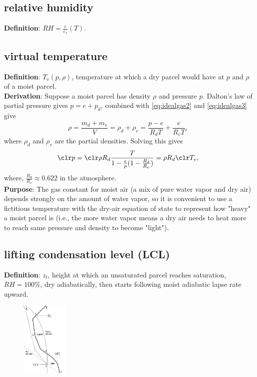 \subsection{relative humidity}
{\bf Definition}: $RH = \frac{e}{e_s}(T)$.

\subsection{virtual temperature}

{\bf Definition}: $T_v(p,\rho)$, temperature at which a dry parcel would have at $p$ and $\rho$ of a
moist parcel. \\

{\bf Derivation}: Suppose a moist parcel has density $\rho$ and pressure $p$.
Dalton's law of partial pressure gives $p = e + p_d$, combined with \eqref{eq:idealgas2} and
\eqref{eq:idealgas3} give
\begin{equation}
   \rho = \frac{m_d + m_v}{V} = \rho_d + \rho_v = \frac{p-e}{R_dT} + \frac{e}{R_vT}, 
\end{equation}
where $\rho_d$ and $\rho_v$ are the partial densities.
Solving this gives
\begin{equation}
   {\clr p} = {\clr \rho} R_d \frac{T}{1-\frac{e}{p}(1-\frac{R_d}{R_v})} = \rho R_d {\clr T_v},
\end{equation}
where, $\frac{R_d}{R_v} \approx 0.622$ in the atmosphere. \\

{\bf Purpose}:
The gas constant for moist air (a mix of pure water vapor and dry air) depends strongly on the
amount of water vapor, so it is convenient to use a fictitious temperature with the dry-air equation
of state to represent how "heavy" a moist parcel is (i.e., the more water vapor means a dry air
needs to heat more to reach same pressure and density to become "light"). \\

\subsection{lifting condensation level (LCL)}
{\bf Definition}: $z_l$, height at which an unsaturated parcel reaches saturation, $RH=100\%$, dry
adiabatically, then starts following moist adiabatic lapse rate upward. 
\begin{figure} [H] 
   \includegraphics[width=0.2\textwidth, height=0.3\textwidth]{sounding.png}
   \caption{\label{sounding}}
\end{figure}

